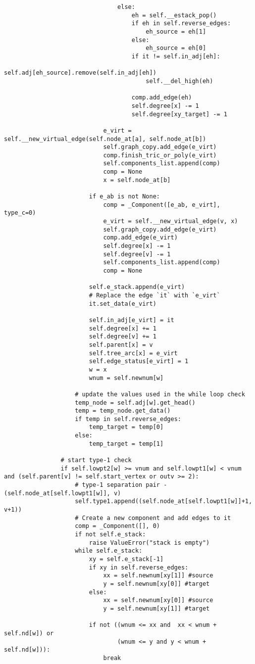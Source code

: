 \begin{center}
\begin{verbatim}
								else:
									eh = self.__estack_pop()
									if eh in self.reverse_edges:
										eh_source = eh[1]
									else:
										eh_source = eh[0]
									if it != self.in_adj[eh]:
										self.adj[eh_source].remove(self.in_adj[eh])
										self.__del_high(eh)

									comp.add_edge(eh)
									self.degree[x] -= 1
									self.degree[xy_target] -= 1

							e_virt = self.__new_virtual_edge(self.node_at[a], self.node_at[b])
							self.graph_copy.add_edge(e_virt)
							comp.finish_tric_or_poly(e_virt)
							self.components_list.append(comp)
							comp = None
							x = self.node_at[b]

						if e_ab is not None:
							comp = _Component([e_ab, e_virt], type_c=0)
							e_virt = self.__new_virtual_edge(v, x)
							self.graph_copy.add_edge(e_virt)
							comp.add_edge(e_virt)
							self.degree[x] -= 1
							self.degree[v] -= 1
							self.components_list.append(comp)
							comp = None

						self.e_stack.append(e_virt)
						# Replace the edge `it` with `e_virt`
						it.set_data(e_virt)

						self.in_adj[e_virt] = it
						self.degree[x] += 1
						self.degree[v] += 1
						self.parent[x] = v
						self.tree_arc[x] = e_virt
						self.edge_status[e_virt] = 1
						w = x
						wnum = self.newnum[w]

					# update the values used in the while loop check
					temp_node = self.adj[w].get_head()
					temp = temp_node.get_data()
					if temp in self.reverse_edges:
						temp_target = temp[0]
					else:
						temp_target = temp[1]

				# start type-1 check
				if self.lowpt2[w] >= vnum and self.lowpt1[w] < vnum and (self.parent[v] != self.start_vertex or outv >= 2):
					# type-1 separation pair - (self.node_at[self.lowpt1[w]], v)
					self.type1.append((self.node_at[self.lowpt1[w]]+1, v+1))
					# Create a new component and add edges to it
					comp = _Component([], 0)
					if not self.e_stack:
						raise ValueError("stack is empty")
					while self.e_stack:
						xy = self.e_stack[-1]
						if xy in self.reverse_edges:
							xx = self.newnum[xy[1]] #source
							y = self.newnum[xy[0]] #target
						else:
							xx = self.newnum[xy[0]] #source
							y = self.newnum[xy[1]] #target

						if not ((wnum <= xx and  xx < wnum + self.nd[w]) or
								(wnum <= y and y < wnum + self.nd[w])):
							break


\end{verbatim}
\end{center}

